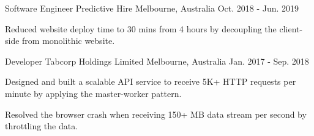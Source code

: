 \begin{cventries}
  \cventry
  {Software Engineer} %
  {Predictive Hire} %
  {Melbourne, Australia} %
  {Oct. 2018 - Jun. 2019} %
  {
    \begin{cvitems} %
      \item {Reduced website deploy time to 30 mins from 4 hours by decoupling the client-side from monolithic website.}
    \end{cvitems}
  }

  \cventry
  {Developer} %
  {Tabcorp Holdings Limited} %
  {Melbourne, Australia}
  {Jan. 2017 - Sep. 2018} %
  {
    \begin{cvitems} %
      \item {Designed and built a scalable API service to receive 5K+ HTTP requests per minute by applying the master-worker pattern.}
      \item {Resolved the browser crash when receiving 150+ MB data stream per second by throttling the data.}
    \end{cvitems}
  }


\end{cventries}

